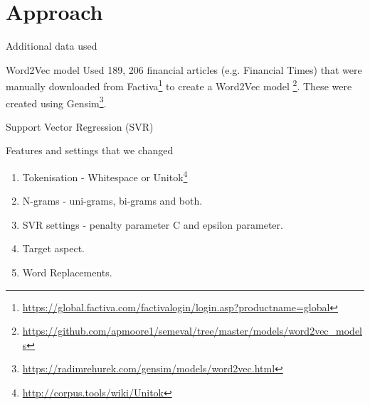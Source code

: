 \documentclass[10pt]{beamer}
\begin{document}
\section{Approach}
\begin{frame}[fragile]{Additional data used}

\begin{block}{Word2Vec model}
Used 189, 206 financial articles (e.g. Financial Times) that were manually downloaded from Factiva\footnote{\url{https://global.factiva.com/factivalogin/login.asp?productname=global}} to create a Word2Vec model \cite{mikolov2013efficient}\footnote{\url{https://github.com/apmoore1/semeval/tree/master/models/word2vec_models}}.\newline\newline
These were created using Gensim\footnote{\url{https://radimrehurek.com/gensim/models/word2vec.html}}.
\end{block}

\end{frame}

\begin{frame}[fragile]{Support Vector Regression (SVR) \cite{drucker1997support}}
\begin{block}{Features and settings that we changed}
\begin{enumerate}
\item Tokenisation - Whitespace or Unitok\footnote{\url{http://corpus.tools/wiki/Unitok}}
\item N-grams - uni-grams, bi-grams and both.
\item SVR settings - penalty parameter C and epsilon parameter.
\item Target aspect. 
\item Word Replacements.
\end{enumerate}

\end{block}

\end{frame}
\end{document}
